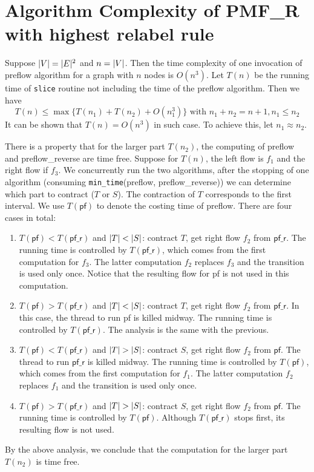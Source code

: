 \documentclass{article}
\begin{document}
\section{Algorithm Complexity of PMF\_R with highest relabel rule}
Suppose $\lvert V\rvert=\lvert E\rvert^2$ and $n=\lvert V\rvert$. Then the time complexity of one invocation of preflow algorithm for a graph with $n$ nodes is $O(n^3)$. Let $T(n)$ be the running time of \texttt{slice} routine not including the time of the preflow algorithm.
Then we have
\begin{equation}
T(n) \leq \max\{T(n_1) + T(n_2) + O(n_1^3)\} \textrm{ with } n_1 + n_2 = n+1, n_1 \leq n_2
\end{equation}
It can be shown that $T(n) = O(n^3)$ in such case. To achieve this,  let $n_1 \approx n_2$.

There is a property that for the larger part $T(n_2)$, the computing of preflow and preflow\_reverse are time free. Suppose for $T(n)$, the left flow is $f_1$ and the right flow if $f_3$. We concurrently run the two algorithms, after the stopping of one algorithm (consuming \texttt{min\_time}(preflow, preflow\_reverse))
we can determine which part to contract ($T$ or $S$). The contraction of $T$ corresponds to the first interval.
We use $T(\textsf{pf})$ to denote the costing time of preflow. There are four cases in total:
\begin{enumerate}
\item $T(\textsf{pf}) < T(\textsf{pf\_r})$ and $\lvert T\rvert < \lvert S\rvert$: contract $T$, get right flow $f_2$ from $\textsf{pf\_r}$. The running time is controlled by  $T(\textsf{pf\_r})$, which comes from the first computation for $f_3$. The latter computation $f_2$ replaces $f_3$ and the transition is used only once. Notice that the resulting flow for \textsf{pf} is not used in this computation.
\item $T(\textsf{pf}) > T(\textsf{pf\_r})$ and $\lvert T\rvert < \lvert S\rvert$: contract $T$, get right flow $f_2$ from $\textsf{pf\_r}$.  In this case, the thread to run \textsf{pf} is killed midway. The running time is controlled by 
$T(\textsf{pf\_r})$. The analysis is the same with the previous.
\item $T(\textsf{pf}) < T(\textsf{pf\_r})$ and $\lvert T\rvert > \lvert S\rvert$: contract $S$, get right flow $f_2$ from $\textsf{pf}$. The thread to run $\textsf{pf\_r}$ is killed midway. The running time is controlled by 
$T(\textsf{pf})$, which comes from the first computation for $f_1$. The latter computation $f_2$ replaces $f_1$ and the transition is used only once. 
\item $T(\textsf{pf}) > T(\textsf{pf\_r})$ and $\lvert T\rvert > \lvert S\rvert$: contract $S$, get right flow $f_2$ from $\textsf{pf}$. The running time is controlled by $T(\textsf{pf})$. Although $T(\textsf{pf\_r})$ stops first, its resulting flow is not used.
\end{enumerate}
By the above analysis, we conclude that the computation for the larger part $T(n_2)$ is time free.
\end{document}
